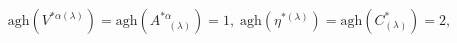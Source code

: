 \begin{equation}
\mathrm{agh}\left( V^{*\alpha (\lambda )}\right) =\mathrm{agh}\left(
A_{\;\;\;(\lambda )}^{*\alpha }\right) =1,\;\mathrm{agh}\left( \eta
^{*(\lambda )}\right) =\mathrm{agh}\left( C_{(\lambda )}^{*}\right) =2,
\label{bf42}
\end{equation}

